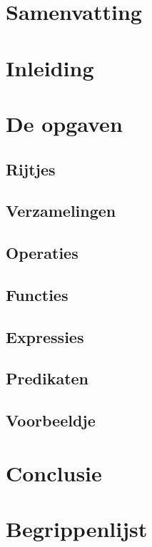 \documentclass[11pt]{report}
\begin{document}


\tableofcontents


\chapter{Samenvatting}



\chapter{Inleiding}



\chapter{De opgaven}

\section{Rijtjes}


\section{Verzamelingen}


\section{Operaties}


\section{Functies}


\section{Expressies}


\section{Predikaten}


\section{Voorbeeldje}



\chapter{Conclusie}



\chapter{Begrippenlijst}




\end{document}
